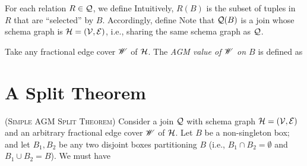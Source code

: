 \vgap

For each relation $R \in \mathcal{Q}$, we define
Intuitively, $R(B)$ is the subset of tuples in $R$ that are ``selected'' by $B$. Accordingly, define
Note that $\mathcal{Q}(B)$ is a join whose schema graph is $\mathcal{H} = (\mathcal{V}, \mathcal{E})$, i.e., sharing the same schema graph as $\mathcal{Q}$.

\vgap

Take any fractional edge cover $\mathscr{W}$ of $\mathcal{H}$. The {\em AGM value of $\mathscr{W}$ on $B$} is defined as


\section{A Split Theorem} \label{sec:split}
%

\begin{theorem} \textsc{(Simple AGM Split Theorem)} \label{thm:split-simple}
    Consider a join $\mathcal{Q}$ with schema graph $\mathcal{H} = (\mathcal{V}, \mathcal{E})$ and an arbitrary fractional edge cover $\mathscr{W}$ of $\mathcal{H}$. Let $B$ be a non-singleton box; and let $B_1, B_2$ be any two disjoint boxes partitioning $B$ (i.e., $B_1 \cap B_2 = \emptyset$ and $B_1 \cup B_2 = B$). We must have
\end{theorem}

